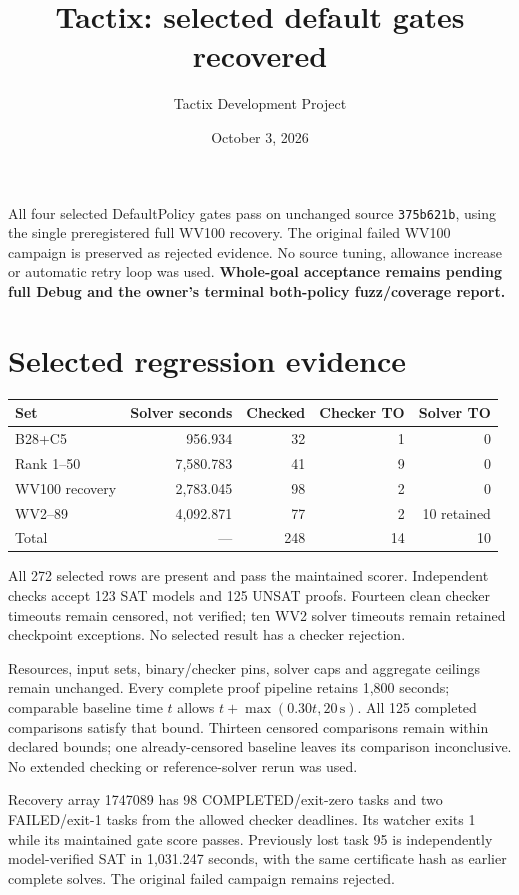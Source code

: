 \documentclass[11pt]{article}
\title{Tactix: selected default gates recovered}
\author{Tactix Development Project}
\date{October 3, 2026}
\begin{document}
\maketitle
All four selected DefaultPolicy gates pass on unchanged source
\texttt{375b621b}, using the single preregistered full WV100 recovery. The
original failed WV100 campaign is preserved as rejected evidence. No source
tuning, allowance increase or automatic retry loop was used.
\textbf{Whole-goal acceptance remains pending full Debug and the owner's
terminal both-policy fuzz/coverage report.}

\section*{Selected regression evidence}
\begin{center}
\begin{tabular}{lrrrr}
\toprule
Set & Solver seconds & Checked & Checker TO & Solver TO \\
\midrule
B28+C5 & 956.934 & 32 & 1 & 0 \\
Rank 1--50 & 7,580.783 & 41 & 9 & 0 \\
WV100 recovery & 2,783.045 & 98 & 2 & 0 \\
WV2--89 & 4,092.871 & 77 & 2 & 10 retained \\
\midrule
Total & --- & 248 & 14 & 10 \\
\bottomrule
\end{tabular}
\end{center}
All 272 selected rows are present and pass the maintained scorer. Independent
checks accept 123 SAT models and 125 UNSAT proofs. Fourteen clean checker
timeouts remain censored, not verified; ten WV2 solver timeouts remain retained
checkpoint exceptions. No selected result has a checker rejection.

Resources, input sets, binary/checker pins, solver caps and aggregate ceilings
remain unchanged. Every complete proof pipeline retains 1,800 seconds;
comparable baseline time $t$ allows $t+\max(0.30t,20\,\mathrm{s})$. All 125
completed comparisons satisfy that bound. Thirteen censored comparisons remain
within declared bounds; one already-censored baseline leaves its comparison
inconclusive. No extended checking or reference-solver rerun was used.

Recovery array 1747089 has 98 COMPLETED/exit-zero tasks and two FAILED/exit-1
tasks from the allowed checker deadlines. Its watcher exits 1 while its
maintained gate score passes. Previously lost task 95 is independently
model-verified SAT in 1,031.247 seconds, with the same certificate hash as
earlier complete solves. The original failed campaign remains rejected.
\end{document}
